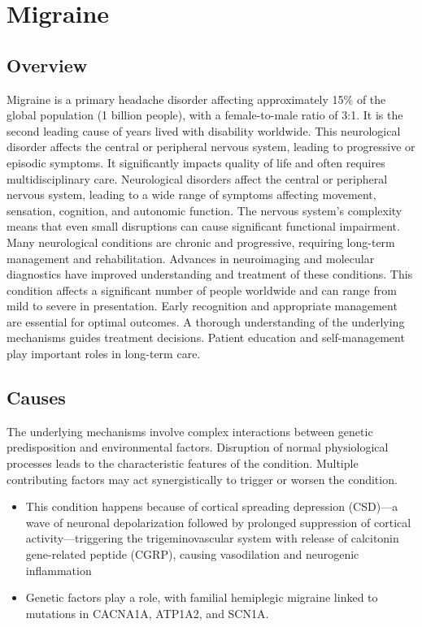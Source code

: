 \chapter{Migraine}
\label{sec:Migraine}

\section{Overview}
Migraine is a primary headache disorder affecting approximately 15\% of the global population (1 billion people), with a female-to-male ratio of 3:1. It is the second leading cause of years lived with disability worldwide. This neurological disorder affects the central or peripheral nervous system, leading to progressive or episodic symptoms. It significantly impacts quality of life and often requires multidisciplinary care. Neurological disorders affect the central or peripheral nervous system, leading to a wide range of symptoms affecting movement, sensation, cognition, and autonomic function. The nervous system's complexity means that even small disruptions can cause significant functional impairment. Many neurological conditions are chronic and progressive, requiring long-term management and rehabilitation. Advances in neuroimaging and molecular diagnostics have improved understanding and treatment of these conditions. This condition affects a significant number of people worldwide and can range from mild to severe in presentation. Early recognition and appropriate management are essential for optimal outcomes. A thorough understanding of the underlying mechanisms guides treatment decisions. Patient education and self-management play important roles in long-term care.
\section{Causes}
The underlying mechanisms involve complex interactions between genetic predisposition and environmental factors. Disruption of normal physiological processes leads to the characteristic features of the condition. Multiple contributing factors may act synergistically to trigger or worsen the condition.

\begin{itemize}[noitemsep]
  \item This condition happens because of cortical spreading depression (CSD)---a wave of neuronal depolarization followed by prolonged suppression of cortical activity---triggering the trigeminovascular system with release of calcitonin gene-related peptide (CGRP), causing vasodilation and neurogenic inflammation
  \item Genetic factors play a role, with familial hemiplegic migraine linked to mutations in CACNA1A, ATP1A2, and SCN1A.
\end{itemize}
